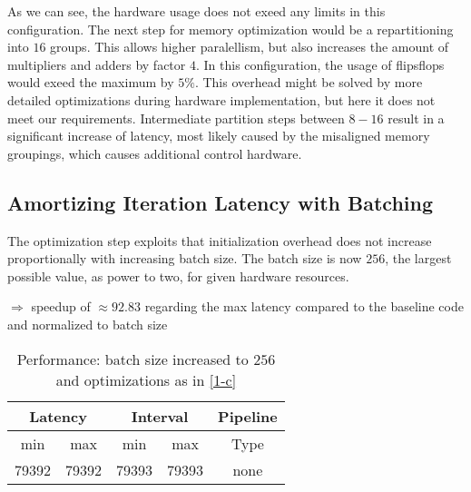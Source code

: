 \documentclass{article}
\begin{document}
	As we can see, the hardware usage does not exeed any limits in this configuration. The next step for memory optimization would be a repartitioning into $16$ groups.
	This allows higher paralellism, but also increases the amount of multipliers and adders by factor $4$. In this configuration, the usage of flipsflops would exeed the maximum by $5\%$. This overhead might be solved by more detailed optimizations during hardware implementation, but here it does not meet our requirements.
	Intermediate partition steps between $8-16$ result in a significant increase of latency, most likely caused by the misaligned memory groupings, which causes additional control hardware.

	\subsection{Amortizing Iteration Latency with Batching}
	The optimization step exploits that initialization overhead does not increase proportionally with increasing batch size. The batch size is now $256$, the largest possible value, as power to two, for given hardware resources.

$\Rightarrow$ speedup of $\approx 92.83 $ regarding the max latency compared to the baseline code and normalized to batch size
	\begin{table}[H]
		\centering
		\begin{tabular}{ccccc}
			\multicolumn{2}{c}{Latency} & \multicolumn{2}{c}{Interval} & Pipeline\\
			\hline
			min  &   max  &   min  &   max  &   Type  \\
			79392&  79392&  79393&  79393&   none  
		\end{tabular}
		\caption{Performance:  batch size increased to $256$ and optimizations as in \ref{1-c}}
		\label{1-d-perf-table}
	\end{table}
\end{document}
